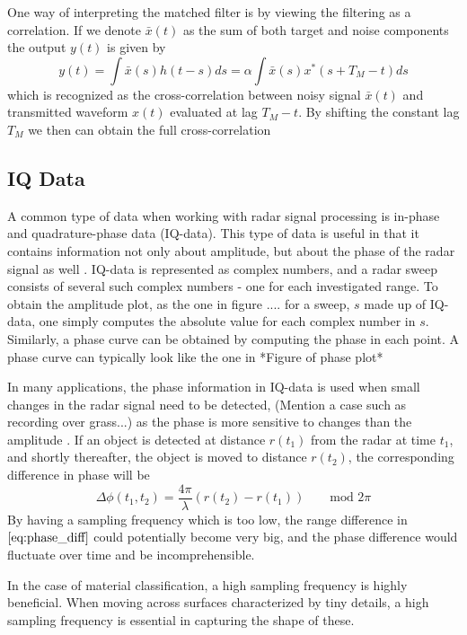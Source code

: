 \documentclass[a4paper, 12pt]{article}
\begin{document}
One way of interpreting the matched filter is by viewing the filtering as a correlation. If we denote $\bar{x}(t)$ as the sum of both target and noise components the output $y(t)$ is given by
%
\begin{equation}
	y(t) = \int \bar{x}(s)h(t-s)ds = \alpha\int \bar{x}(s)x^*(s + T_M - t)ds
\end{equation}
%
which is recognized as the cross-correlation between noisy signal $\bar	{x}(t)$ and transmitted waveform $x(t)$ evaluated at lag $T_M-t$. By shifting the constant lag $T_M$ we then can obtain the full cross-correlation 

\subsection{IQ Data}
A common type of data when working with radar signal processing is in-phase and quadrature-phase data (IQ-data).  This type of data is useful in that it contains information not only about amplitude, but about the phase of the radar signal as well \citep{richards_2014}. IQ-data is represented as complex numbers, and a radar sweep consists of several such complex numbers - one for each investigated range. To obtain the amplitude plot, as the one in figure .... for a sweep, $s$ made up of IQ-data, one simply computes the absolute value for each complex number in $s$. Similarly, a phase curve can be obtained by computing the phase in each point. A phase curve can typically look like the one in *Figure of phase plot*

In many applications, the phase information in IQ-data is used when small changes in the radar signal need to be detected, (Mention a case such as recording over grass...) as the phase is more sensitive to changes than the amplitude \citep{lien_gillian_karagozler_amihood_schwesig_olson_raja_poupyrev_2016}. If an object is detected at distance $r(t_1)$ from the radar at time $t_1$, and shortly thereafter, the object is moved to distance $r(t_2)$, the corresponding difference in phase will be
\begin{equation}
	\label{eq:phase_diff}
	\Delta\phi(t_1, t_2)=\frac{4\pi}{\lambda}(r(t_2)-r(t_1)) \quad\quad \textrm{mod 2$\pi$}
\end{equation}
By having a sampling frequency which is too low, the range difference in $\eqref{eq:phase_diff}$ could potentially become very big, and the phase difference would fluctuate over time and be incomprehensible.

In the case of material classification, a high sampling frequency is highly beneficial. When moving across surfaces characterized by tiny details, a high sampling frequency is essential in capturing the shape of these.
\end{document}
